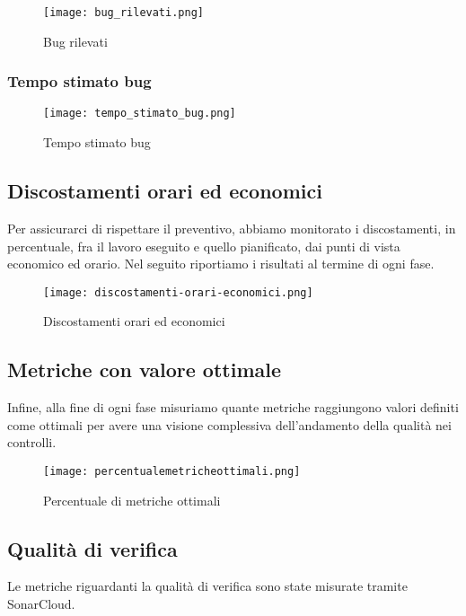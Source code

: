 \documentclass[../piano-di-qualifica.tex]{subfiles}
\begin{document}
\begin{figure}[H]
  \centering
  \texttt{[image: bug\_rilevati.png]}%
  \caption{Bug rilevati}%
  \label{fig:bug_rilevati}%
\end{figure}

\subsubsection{Tempo stimato bug}%
\label{subs:tempo_stimato}

\begin{figure}[H]
  \centering
  \texttt{[image: tempo\_stimato\_bug.png]}%
  \caption{Tempo stimato bug}%
  \label{fig:tempo_stimato_bug}%
\end{figure}


\newpage

\subsection{Discostamenti orari ed economici}%
\label{sub:discostamenti_orari_ed_economici}
Per assicurarci di rispettare il preventivo, abbiamo monitorato i discostamenti, in percentuale, fra il lavoro eseguito e quello pianificato, dai punti di vista economico ed orario. Nel seguito riportiamo i risultati al termine di ogni fase.

\begin{figure}[H]
  \centering
  \texttt{[image: discostamenti-orari-economici.png]}%
  \caption{Discostamenti orari ed economici}%
  \label{fig:discostamenti_orari_economici}%
\end{figure}

\subsection{Metriche con valore ottimale}%
\label{sub:metriche_ottimali}
Infine, alla fine di ogni fase misuriamo quante metriche raggiungono valori definiti come ottimali per avere una visione complessiva dell'andamento della qualità nei controlli.
\begin{figure}[H]
  \centering
  \texttt{[image: percentualemetricheottimali.png]}%
  \caption{Percentuale di metriche ottimali}%
  \label{fig:metriche_ottimali}%
\end{figure}

\newpage


\subsection{Qualità di verifica}%
\label{sub:qualita_verifica_report}
Le metriche riguardanti la qualità di verifica sono state misurate tramite SonarCloud.
\end{document}
